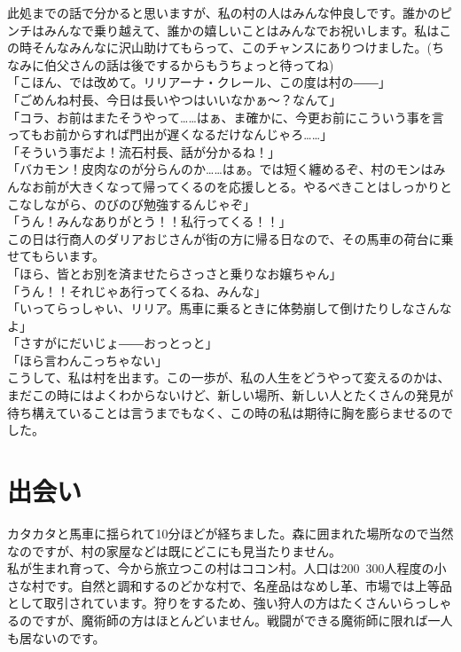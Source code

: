 \documentclass[oneside, a4paper]{jsbook}
\begin{document}
此処までの話で分かると思いますが、私の村の人はみんな仲良しです。誰かのピンチはみんなで乗り越えて、誰かの嬉しいことはみんなでお祝いします。私はこの時そんなみんなに沢山助けてもらって、このチャンスにありつけました。(ちなみに伯父さんの話は後でするからもうちょっと待ってね)\\

\noindent
「こほん、では改めて。リリアーナ・クレール、この度は村の――」\\
「ごめんね村長、今日は長いやつはいいなかぁ～？なんて」\\
「コラ、お前はまたそうやって……はぁ、ま確かに、今更お前にこういう事を言ってもお前からすれば門出が遅くなるだけなんじゃろ……」\\
「そういう事だよ！流石村長、話が分かるね！」\\
「バカモン！皮肉なのが分らんのか……はぁ。では短く纏めるぞ、村のモンはみんなお前が大きくなって帰ってくるのを応援しとる。やるべきことはしっかりとこなしながら、のびのび勉強するんじゃぞ」\\
「うん！みんなありがとう！！私行ってくる！！」\\

この日は行商人のダリアおじさんが街の方に帰る日なので、その馬車の荷台に乗せてもらいます。\\

\noindent
「ほら、皆とお別を済ませたらさっさと乗りなお嬢ちゃん」\\
「うん！！それじゃあ行ってくるね、みんな」\\
「いってらっしゃい、リリア。馬車に乗るときに体勢崩して倒けたりしなさんなよ」\\
「さすがにだいじょ――おっとっと」\\
「ほら言わんこっちゃない」\\

こうして、私は村を出ます。この一歩が、私の人生をどうやって変えるのかは、まだこの時にはよくわからないけど、新しい場所、新しい人とたくさんの発見が待ち構えていることは言うまでもなく、この時の私は期待に胸を膨らませるのでした。

\newpage

\section{出会い}

カタカタと馬車に揺られて10分ほどが経ちました。森に囲まれた場所なので当然なのですが、村の家屋などは既にどこにも見当たりません。\\

私が生まれ育って、今から旅立つこの村はココン村。人口は200~300人程度の小さな村です。自然と調和するのどかな村で、名産品はなめし革、市場では上等品として取引されています。狩りをするため、強い狩人の方はたくさんいらっしゃるのですが、魔術師の方はほとんどいません。戦闘ができる魔術師に限れば一人も居ないのです。\\
\end{document}
